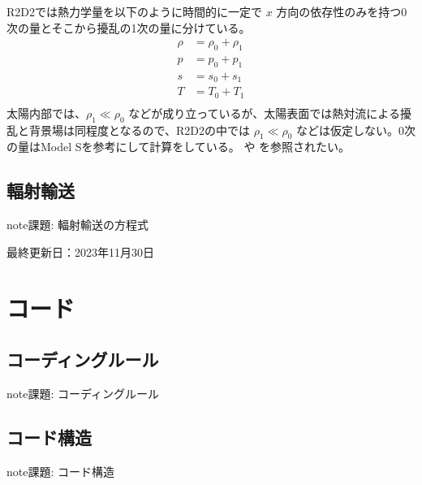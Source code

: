 \documentclass[letterpaper,10pt,dvipdfmx,report]{sphinxmanual}
\begin{document}
\sphinxAtStartPar
R2D2では熱力学量を以下のように時間的に一定で \(x\) 方向の依存性のみを持つ0次の量とそこから擾乱の1次の量に分けている。
\begin{equation*}
\begin{split}\rho &= \rho_0 + \rho_1 \\
p &= p_0 + p_1 \\
s &= s_0 + s_1 \\
T &= T_0 + T_1 \\\end{split}
\end{equation*}
\sphinxAtStartPar
太陽内部では、\(\rho_1 \ll \rho_0\) などが成り立っているが、太陽表面では熱対流による擾乱と背景場は同程度となるので、R2D2の中では \(\rho_1 \ll \rho_0\) などは仮定しない。0次の量はModel Sを参考にして計算をしている。 や  を参照されたい。


\section{輻射輸送}
\label{\detokenize{equation:id3}}
\begin{sphinxadmonition}{note}{\label{\detokenize{equation:id4}}課題:}
\sphinxAtStartPar
輻射輸送の方程式
\end{sphinxadmonition}

\sphinxAtStartPar
最終更新日：2023年11月30日

\sphinxstepscope


\chapter{コード}
\label{\detokenize{code:id1}}\label{\detokenize{code::doc}}

\section{コーディングルール}
\label{\detokenize{code:id2}}
\begin{sphinxadmonition}{note}{\label{\detokenize{code:id3}}課題:}
\sphinxAtStartPar
コーディングルール
\end{sphinxadmonition}


\section{コード構造}
\label{\detokenize{code:id4}}
\begin{sphinxadmonition}{note}{\label{\detokenize{code:id5}}課題:}
\sphinxAtStartPar
コード構造
\end{sphinxadmonition}
\end{document}
